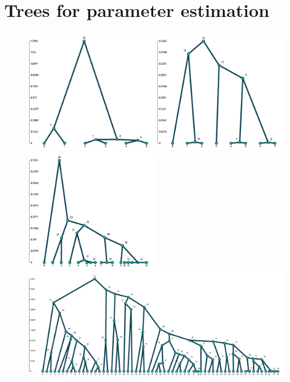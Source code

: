 \section{Trees for parameter estimation}
\begin{figure}[H]
    \begin{flushleft}
        \includegraphics[width=0.49\textwidth]{figures/panX_trees/803.pdf}
        \includegraphics[width=0.49\textwidth]{figures/panX_trees/985002.pdf}\\
        \includegraphics[width=0.49\textwidth]{figures/panX_trees/1492.pdf}\\
        \includegraphics[width=\textwidth]{figures/panX_trees/9.pdf}

\end{flushleft}
\end{figure}
